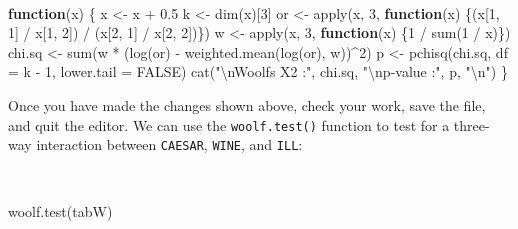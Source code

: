 \documentclass[
  12pt,
  a4paper]{book}
\newenvironment{Shaded}{\begin{snugshade}}{\end{snugshade}}
\newcommand{\AttributeTok}[1]{\textcolor[rgb]{0.77,0.63,0.00}{#1}}
\newcommand{\ConstantTok}[1]{\textcolor[rgb]{0.00,0.00,0.00}{#1}}
\newcommand{\ControlFlowTok}[1]{\textcolor[rgb]{0.13,0.29,0.53}{\textbf{#1}}}
\newcommand{\DecValTok}[1]{\textcolor[rgb]{0.00,0.00,0.81}{#1}}
\newcommand{\FloatTok}[1]{\textcolor[rgb]{0.00,0.00,0.81}{#1}}
\newcommand{\FunctionTok}[1]{\textcolor[rgb]{0.00,0.00,0.00}{#1}}
\newcommand{\NormalTok}[1]{#1}
\newcommand{\OtherTok}[1]{\textcolor[rgb]{0.56,0.35,0.01}{#1}}
\newcommand{\SpecialCharTok}[1]{\textcolor[rgb]{0.00,0.00,0.00}{#1}}
\newcommand{\StringTok}[1]{\textcolor[rgb]{0.31,0.60,0.02}{#1}}
\begin{document}
~

\begin{Shaded}
\begin{Highlighting}[]
\ControlFlowTok{function}\NormalTok{(x) \{}
\NormalTok{  x }\OtherTok{\textless{}{-}}\NormalTok{ x }\SpecialCharTok{+} \FloatTok{0.5}
\NormalTok{  k }\OtherTok{\textless{}{-}} \FunctionTok{dim}\NormalTok{(x)[}\DecValTok{3}\NormalTok{]}
\NormalTok{  or }\OtherTok{\textless{}{-}} \FunctionTok{apply}\NormalTok{(x, }\DecValTok{3}\NormalTok{, }\ControlFlowTok{function}\NormalTok{(x)}
\NormalTok{              \{(x[}\DecValTok{1}\NormalTok{, }\DecValTok{1}\NormalTok{] }\SpecialCharTok{/}\NormalTok{ x[}\DecValTok{1}\NormalTok{, }\DecValTok{2}\NormalTok{]) }\SpecialCharTok{/}\NormalTok{ (x[}\DecValTok{2}\NormalTok{, }\DecValTok{1}\NormalTok{] }\SpecialCharTok{/}\NormalTok{ x[}\DecValTok{2}\NormalTok{, }\DecValTok{2}\NormalTok{])\})}
\NormalTok{  w }\OtherTok{\textless{}{-}} \FunctionTok{apply}\NormalTok{(x, }\DecValTok{3}\NormalTok{, }\ControlFlowTok{function}\NormalTok{(x) \{}\DecValTok{1} \SpecialCharTok{/} \FunctionTok{sum}\NormalTok{(}\DecValTok{1} \SpecialCharTok{/}\NormalTok{ x)\})}
\NormalTok{  chi.sq }\OtherTok{\textless{}{-}} \FunctionTok{sum}\NormalTok{(w }\SpecialCharTok{*}\NormalTok{ (}\FunctionTok{log}\NormalTok{(or) }\SpecialCharTok{{-}} \FunctionTok{weighted.mean}\NormalTok{(}\FunctionTok{log}\NormalTok{(or), w))}\SpecialCharTok{\^{}}\DecValTok{2}\NormalTok{)}
\NormalTok{  p }\OtherTok{\textless{}{-}} \FunctionTok{pchisq}\NormalTok{(chi.sq, }\AttributeTok{df =}\NormalTok{ k }\SpecialCharTok{{-}} \DecValTok{1}\NormalTok{, }\AttributeTok{lower.tail =} \ConstantTok{FALSE}\NormalTok{)}
  \FunctionTok{cat}\NormalTok{(}\StringTok{"}\SpecialCharTok{\textbackslash{}n}\StringTok{Woolf\textquotesingle{}s X2 :"}\NormalTok{, chi.sq,}
      \StringTok{"}\SpecialCharTok{\textbackslash{}n}\StringTok{p{-}value    :"}\NormalTok{, p, }\StringTok{"}\SpecialCharTok{\textbackslash{}n}\StringTok{"}\NormalTok{)}
\NormalTok{\}}
\end{Highlighting}
\end{Shaded}

\newpage

Once you have made the changes shown above, check your work, save the file, and quit the editor.
We can use the \texttt{woolf.test()} function to test for a three-way interaction between \texttt{CAESAR}, \texttt{WINE}, and \texttt{ILL}:

~

\begin{Shaded}
\begin{Highlighting}[]
\FunctionTok{woolf.test}\NormalTok{(tabW)}
\end{Highlighting}
\end{Shaded}
\end{document}

